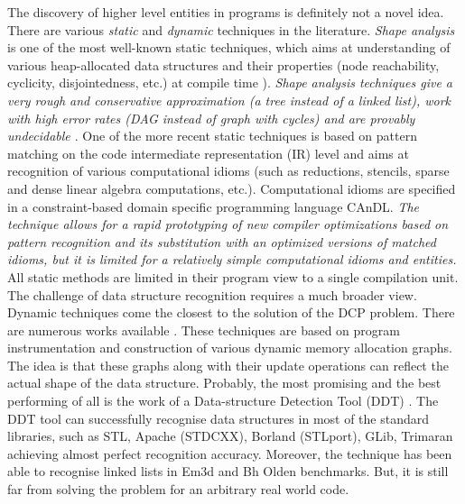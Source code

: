 \begin{description}[style=unboxed,leftmargin=0cm]
\item[\textit{Limitations of "The state of the art" work}] The discovery of higher level entities in programs is definitely not a novel idea. There are various \textit{static} and \textit{dynamic} techniques in the literature. \textit{Shape analysis} is one of the most well-known static techniques, which aims at understanding of various heap-allocated data structures and their properties (node reachability, cyclicity, disjointedness, etc.) at compile time \cite{Ghiya:1996:TDC:237721.237724}\cite{Sagiv:1999:PSA:292540.292552}\cite{Wilhelm:2000:SA:647476.760384}). \textit{Shape analysis techniques give a very rough and conservative approximation (a \textit{tree} instead of a \textit{linked list}), work with high error rates (\textit{DAG} instead of \textit{graph with cycles}) and are provably undecidable \cite{Muchnick:1998:ACD:286076}}. One of the more recent static techniques is based on pattern matching on the code intermediate representation (IR) level and aims at recognition of various computational idioms (such as reductions, stencils, sparse and dense linear algebra computations, etc.)\cite{Ginsbach:2017:DEG:3049832.3049862}\cite{Ginsbach:2018:CDS:3178372.3179515}\cite{Ginsbach:2018:AML:3296957.3173182}. Computational idioms are specified in a constraint-based domain specific programming language CAnDL. \textit{The technique allows for a rapid prototyping of new compiler optimizations based on pattern recognition and its substitution with an optimized versions of matched idioms, but it is limited for a relatively simple computational idioms and entities.} All static methods are limited in their program view to a single compilation unit. The challenge of data structure recognition requires a much broader view. Dynamic techniques come the closest to the solution of the DCP problem. There are numerous works available \cite{Haller:2016:SDS:2938006.2938029}\cite{Rupprecht:2017:DID:3155562.3155607}. These techniques are based on program instrumentation and construction of various dynamic memory allocation graphs. The idea is that these graphs along with their update operations can reflect the actual shape of the data structure. Probably, the most promising and the best performing of all is the work of a Data-structure Detection Tool (DDT) \cite{1669122}. The DDT tool can successfully recognise data structures in most of the standard libraries, such as STL, Apache (STDCXX), Borland (STLport), GLib, Trimaran achieving almost perfect recognition accuracy. Moreover, the technique has been able to recognise linked lists in Em3d and Bh Olden benchmarks. But, it is still far from solving the problem for an arbitrary real world code.

\end{description}

